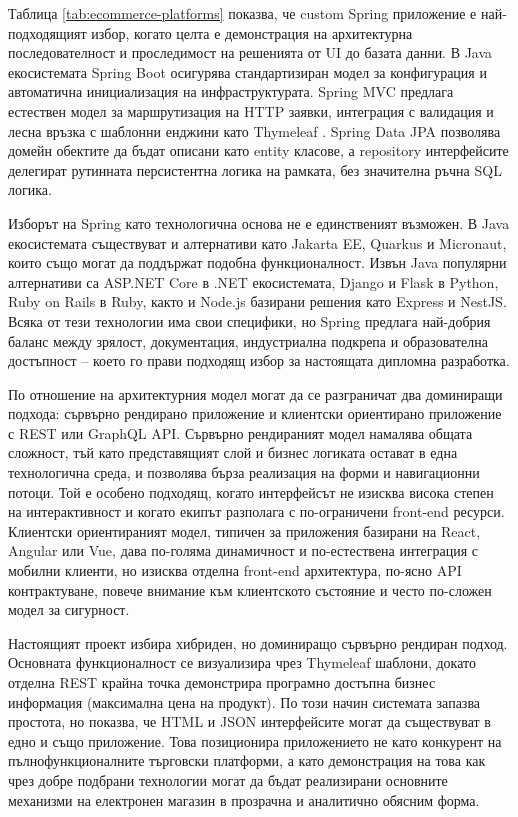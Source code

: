 Таблица \ref{tab:ecommerce-platforms} показва, че custom Spring приложение е най-подходящият избор, когато целта е демонстрация на архитектурна последователност и проследимост на решенията от UI до базата данни. В Java екосистемата Spring Boot \cite{springboot} осигурява стандартизиран модел за конфигурация и автоматична инициализация на инфраструктурата. Spring MVC \cite{springmvc} предлага естествен модел за маршрутизация на HTTP заявки, интеграция с валидация и лесна връзка с шаблонни енджини като Thymeleaf \cite{thymeleaf}. Spring Data JPA \cite{springdatajpa} позволява домейн обектите да бъдат описани като entity класове, а repository интерфейсите делегират рутинната персистентна логика на рамката, без значителна ръчна SQL логика.

Изборът на Spring като технологична основа не е единственият възможен. В Java екосистемата съществуват и алтернативи като Jakarta EE, Quarkus и Micronaut, които също могат да поддържат подобна функционалност. Извън Java популярни алтернативи са ASP.NET Core в .NET екосистемата, Django и Flask в Python, Ruby on Rails в Ruby, както и Node.js базирани решения като Express и NestJS. Всяка от тези технологии има свои специфики, но Spring предлага най-добрия баланс между зрялост, документация, индустриална подкрепа и образователна достъпност -- което го прави подходящ избор за настоящата дипломна разработка.

По отношение на архитектурния модел могат да се разграничат два доминиращи подхода: сървърно рендирано приложение и клиентски ориентирано приложение с REST или GraphQL API. Сървърно рендираният модел намалява общата сложност, тъй като представящият слой и бизнес логиката остават в една технологична среда, и позволява бърза реализация на форми и навигационни потоци. Той е особено подходящ, когато интерфейсът не изисква висока степен на интерактивност и когато екипът разполага с по-ограничени front-end ресурси. Клиентски ориентираният модел, типичен за приложения базирани на React, Angular или Vue, дава по-голяма динамичност и по-естествена интеграция с мобилни клиенти, но изисква отделна front-end архитектура, по-ясно API контрактуване, повече внимание към клиентското състояние и често по-сложен модел за сигурност.

Настоящият проект избира хибриден, но доминиращо сървърно рендиран подход. Основната функционалност се визуализира чрез Thymeleaf шаблони, докато отделна REST крайна точка демонстрира програмно достъпна бизнес информация (максимална цена на продукт). По този начин системата запазва простота, но показва, че HTML и JSON интерфейсите могат да съществуват в едно и също приложение. Това позиционира приложението не като конкурент на пълнофункционалните търговски платформи, а като демонстрация на това как чрез добре подбрани технологии могат да бъдат реализирани основните механизми на електронен магазин в прозрачна и аналитично обясним форма.

